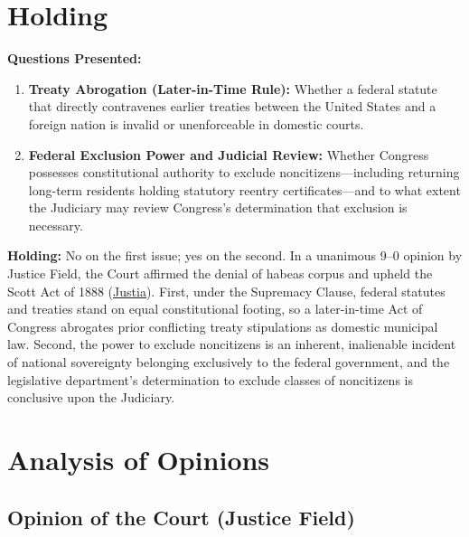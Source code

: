 \documentclass[12pt]{article}
\begin{document}
\section{Holding}
\textbf{Questions Presented:}

\begin{enumerate}
  \item \textbf{Treaty Abrogation (Later-in-Time Rule):} Whether a federal statute that directly contravenes earlier treaties between the United States and a foreign nation is invalid or unenforceable in domestic courts.
  \item \textbf{Federal Exclusion Power and Judicial Review:} Whether Congress possesses constitutional authority to exclude noncitizens---including returning long-term residents holding statutory reentry certificates---and to what extent the Judiciary may review Congress's determination that exclusion is necessary.
\end{enumerate}

\textbf{Holding:} No on the first issue; yes on the second. In a unanimous 9--0 opinion by Justice Field, the Court affirmed the denial of habeas corpus and upheld the Scott Act of 1888 (\href{https://supreme.justia.com/cases/federal/us/130/581/}{Justia}). First, under the Supremacy Clause, federal statutes and treaties stand on equal constitutional footing, so a later-in-time Act of Congress abrogates prior conflicting treaty stipulations as domestic municipal law. Second, the power to exclude noncitizens is an inherent, inalienable incident of national sovereignty belonging exclusively to the federal government, and the legislative department's determination to exclude classes of noncitizens is conclusive upon the Judiciary.

\section{Analysis of Opinions}
\subsection{Opinion of the Court (Justice Field)}
\end{document}
